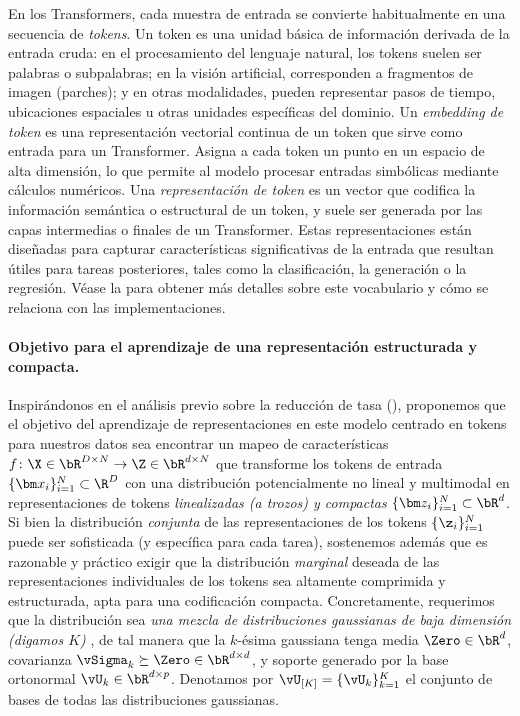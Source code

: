 \documentclass[../../book-main.tex]{subfiles}
\begin{document}
\begin{remark}
    En los Transformers, cada muestra de entrada se convierte habitualmente en una
    secuencia de {\em tokens}. Un token es una unidad básica de información
    derivada de la entrada cruda: en el procesamiento del lenguaje natural,
    los tokens suelen ser palabras o subpalabras; en la visión artificial,
    corresponden a fragmentos de imagen (parches); y en otras modalidades, pueden
    representar pasos de tiempo, ubicaciones espaciales u otras unidades
    específicas del dominio. Un {\em \textit{embedding} de token} es una representación vectorial continua
    de un token que sirve como entrada para un
    Transformer. Asigna a cada token un punto en un espacio de alta dimensión,
    lo que permite al modelo procesar entradas simbólicas mediante
    cálculos numéricos.
    Una {\em representación de token} es un vector que codifica la
    información semántica o estructural de un token, y suele ser generada
    por las capas intermedias o finales de un Transformer. Estas
    representaciones están diseñadas para capturar características significativas de
    la entrada que resultan útiles para tareas posteriores, tales como
    la clasificación, la generación o la regresión. Véase la
     para obtener más detalles sobre este
    vocabulario y cómo se relaciona con las implementaciones.
\end{remark}

\paragraph{Objetivo para el aprendizaje de una representación estructurada y compacta.}
Inspirándonos en el análisis previo sobre la reducción de tasa
(), proponemos que el
objetivo del aprendizaje de representaciones
en este modelo centrado en tokens para nuestros datos sea encontrar un
mapeo de características \(f
\colon \X \in \bR^{D \times N} \to \Z\in \bR^{d \times N}\) que
transforme los tokens de entrada \(\{\bm x_i\}_{i=1}^N \subset \R^D\) con una
distribución potencialmente no lineal y multimodal en representaciones de tokens
\textit{linealizadas (a trozos) y compactas} \(\{\bm z_i\}_{i=1}^N \subset \bR^{d}\). 
Si bien la distribución {\em conjunta}
de las representaciones de los tokens \(\{\z_{i}\}_{i = 1}^{N}\) puede ser
sofisticada (y específica para cada tarea), sostenemos además que es
razonable y práctico
exigir que la distribución {\em marginal} deseada de las representaciones
individuales de los tokens sea altamente comprimida y estructurada,
apta para una codificación compacta. Concretamente, requerimos que la
distribución sea \textit{una mezcla de distribuciones gaussianas de baja dimensión (digamos \(K\))
}, de tal manera que la \(k\)-ésima gaussiana tenga media \(\Zero \in
\bR^{d}\), covarianza \(\vSigma_{k} \succeq \Zero \in \bR^{d \times
d}\), y soporte generado por la base ortonormal \(\vU_{k} \in
\bR^{d \times p}\).
Denotamos por $\vU_{[K]} = \{\vU_k\}_{k=1}^K$ el conjunto de bases de
todas las distribuciones gaussianas.
\end{document}

